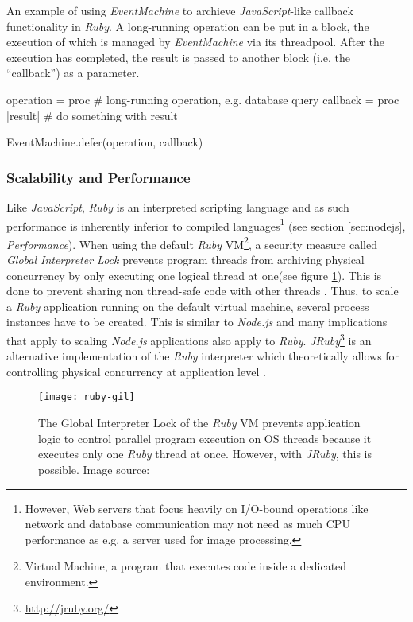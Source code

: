 \begin{program}
  \caption{An example of using \textit{EventMachine} to archieve \textit{JavaScript}-like callback functionality in \textit{Ruby}. A long-running operation can be put in a block, the execution of which is managed by \textit{EventMachine} via its threadpool. After the execution has completed, the result is passed to another block (i.e. the ``callback'') as a parameter.}
  \label{prog:ruby-defer}
  \begin{JavaCode}
operation = proc {
    # long-running operation, e.g. database query
}
callback = proc { |result|
    # do something with result
}

EventMachine.defer(operation, callback)
  \end{JavaCode}
\end{program}

\subsubsection*{Scalability and Performance}
Like \textit{JavaScript}, \textit{Ruby} is an interpreted scripting language and as such performance is inherently inferior to compiled languages\footnote{However, Web servers that focus heavily on I/O-bound operations like network and database communication may not need as much CPU performance as e.g. a server used for image processing.} (see section \ref{sec:nodejs}, \textit{Performance}). When using the default \textit{Ruby} VM\footnote{Virtual Machine, a program that executes code inside a dedicated environment.}, a security measure called \textit{Global Interpreter Lock} prevents program threads from archiving physical concurrency by only executing one logical thread at one(see figure \ref{fig:gil}). This is done to prevent sharing non thread-safe code with other threads \cite{ruby-gil}. Thus, to scale a \textit{Ruby} application running on the default virtual machine, several process instances have to be created. This is similar to \textit{Node.js} and many implications that apply to scaling \textit{Node.js} applications also apply to \textit{Ruby}. \textit{JRuby}\footnote{\url{http://jruby.org/}} is an alternative implementation of the \textit{Ruby} interpreter which theoretically allows for controlling physical concurrency at application level \cite{ruby-gil}.

\begin{figure}
\centering\small
\setlength{\tabcolsep}{0mm}
  \texttt{[image: ruby-gil]}
\caption{
The Global Interpreter Lock of the \textit{Ruby} VM prevents application logic to control parallel program execution on OS threads because it executes only one \textit{Ruby} thread at once. However, with \textit{JRuby}, this is possible. Image source: \cite{ruby-gil}}
\label{fig:gil}
\end{figure}

